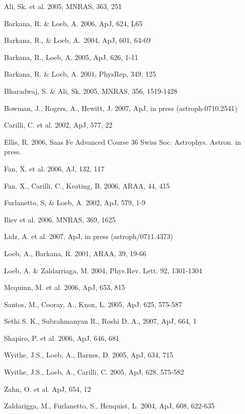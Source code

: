 \documentclass[manuscript]{aastex}
\begin{document}
\begin{thebibliography}{}

\bibitem{}
Ali, Sk. et al. 2005, MNRAS, 363, 251

\bibitem{}Barkana, R. \& Loeb, A. 2006, ApJ, 624, L65

 Barkana, R., \&
  Loeb, A.\ 2004, ApJ, 601, 64-69

Barkana, R., Loeb, A. 2005, ApJ, 626, 1-11

\bibitem{}Barkana, R. \& Loeb, A. 2001, PhysRep, 349, 125

\bibitem{}Bharadwaj, S. \& Ali, Sk. 2005, MNRAS, 356, 1519-1428

\bibitem{}Bowman, J., Rogers, A., Hewitt, J. 2007, 
ApJ, in press (astroph-0710.2541)

\bibitem{}Carilli, C. et al. 2002, ApJ, 577, 22

\bibitem{}Ellis, R. 2006, Saas Fe Advanced Course 36
Swiss Soc. Astrophys. Astron. in press.

\bibitem{}Fan,  X. et al. 2006, AJ, 132, 117

\bibitem{} Fan. X., Carilli, C., Keating, B. 2006, ARAA, 44, 415

\bibitem{}
Furlanetto, S, \&  Loeb, A. 2002, ApJ, 579, 1-9

\bibitem{}Iliev et al. 2006, MNRAS, 369, 1625

\bibitem{}Lidz, A. et al. 2007, ApJ, in press (astroph/0711.4373)

\bibitem{}
Loeb, A., Barkana, R. 2001, ARAA, 39, 19-66

\bibitem{}Loeb, A. \& Zaldarriaga, M. 2004, Phys.Rev. Lett.
92, 1301-1304

\bibitem{} Mcquinn, M. et al.  2006, ApJ, 653, 815

Santos, M., Cooray, A., Knox, L. 2005, ApJ,
625, 575-587

\bibitem{}Sethi S. K., Subrahmanyan R., Roshi D. A., 2007, ApJ, 664, 1

\bibitem{}Shapiro, P. et al. 2006, ApJ, 646, 681

\bibitem{}
Wyithe, J.S., Loeb, A., Barnes, D. 2005, ApJ, 634, 715

\bibitem{}Wyithe, J.S., Loeb, A., Carilli, C. 2005,
ApJ, 628, 575-582

\bibitem{}Zahn, O. et al. ApJ, 654, 12

\bibitem{}
Zaldarigga, M., Furlanetto, S., Henquist, L. 2004, ApJ, 608, 622-635

\end{thebibliography}{}
\end{document}
